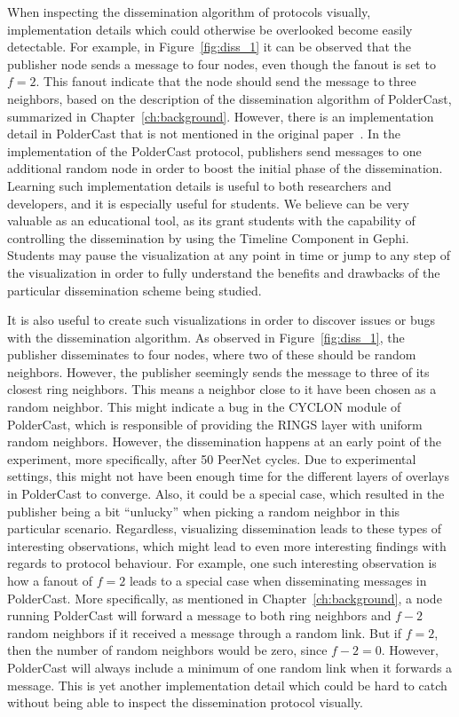 When inspecting the dissemination algorithm of protocols visually,
implementation details which could otherwise be overlooked become easily
detectable. For example, in Figure~\ref{fig:diss_1} it can be observed
that the publisher node sends a message to four nodes, even though the
fanout is set to $f=2$. This fanout indicate that the node
should send the message to three neighbors, based on the description of
the dissemination algorithm of PolderCast, summarized in
Chapter~\ref{ch:background}. However, there is an implementation detail
in PolderCast that is not mentioned in the original
paper~\cite{Setty:2012}. In the implementation of the PolderCast
protocol, publishers send messages to one additional random node in
order to boost the initial phase of the dissemination. Learning such
implementation details is useful to both researchers and developers, and
it is especially useful for students. We believe \demo can be very
valuable as an educational tool, as its grant students with the
capability of controlling the dissemination by using the Timeline
Component in Gephi. Students may pause the visualization at any point in
time or jump to any step of the visualization in order to fully
understand the benefits and drawbacks of the particular dissemination
scheme being studied.

It is also useful to create such visualizations in order to discover
issues or bugs with the dissemination algorithm. As observed in
Figure~\ref{fig:diss_1}, the publisher disseminates to four nodes, where
two of these should be random neighbors. However, the publisher
seemingly sends the message to three of its closest ring neighbors.
This means a neighbor close to it have been chosen as a random neighbor.
This might indicate a bug in the CYCLON module of PolderCast, which is
responsible of providing the RINGS layer with uniform random neighbors.
However, the dissemination happens at an early point of the experiment,
more specifically, after 50 PeerNet cycles. Due to experimental
settings, this might not have been enough time for the different layers
of overlays in PolderCast to converge. Also, it could be a special case,
which resulted in the publisher being a bit ``unlucky'' when picking a
random neighbor in this particular scenario. Regardless, visualizing
dissemination leads to these types of interesting observations, which
might lead to even more interesting findings with regards to protocol
behaviour. For example, one such interesting observation is how a fanout
of $f=2$ leads to a special case when disseminating messages in
PolderCast. More specifically, as mentioned in
Chapter~\ref{ch:background}, a node running PolderCast will forward a
message to both ring neighbors and $f-2$ random neighbors if it received
a message through a random link.  But if $f=2$, then the number of
random neighbors would be zero, since $f-2 = 0$. However, PolderCast
will always include a minimum of one random link when it forwards a
message. This is yet another implementation detail which could be hard
to catch without being able to inspect the dissemination protocol
visually.

